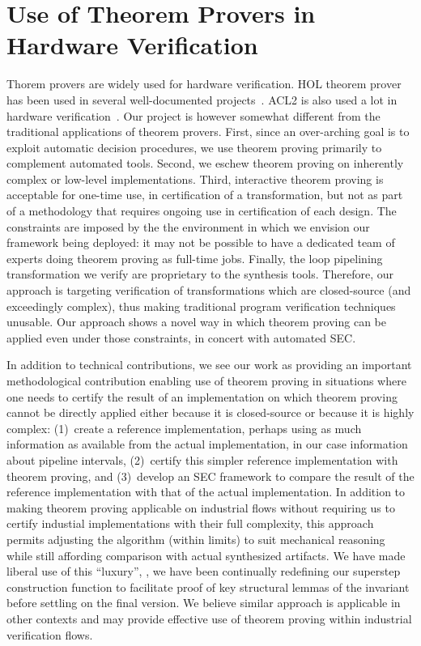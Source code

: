 \section{Use of Theorem Provers in Hardware Verification}
Thorem provers are widely used for hardware verification. 
HOL theorem prover~\cite{hol} has been used in 
several well-documented projects~\cite{cohn,graham}.
ACL2 is also used a lot in hardware 
verification~\cite{Russinoff,car2,car,Hardin,ray-abstracting,ray-connecting,ray-certification}. 
Our project is however somewhat different from the
traditional applications of theorem provers. 
First, since an over-arching goal is to exploit automatic
decision procedures, we use theorem proving primarily to
complement automated tools. Second, we eschew theorem
proving on inherently complex or low-level implementations.
Third, interactive theorem proving is acceptable for
one-time use, in certification of a transformation, 
but not as part of a methodology that
requires ongoing use in certification of each design. The
constraints are imposed by the the environment in which we
envision our framework being deployed: it may not be
possible to have a dedicated team of experts doing theorem
proving as full-time jobs. Finally, the loop pipelining transformation
we verify are proprietary to the synthesis tools. Therefore, our approach is
targeting verification of transformations
which are closed-source (and exceedingly complex), thus
making traditional program verification techniques unusable.
Our approach shows a novel way in which theorem
proving can be applied even under those constraints, in
concert with automated SEC.

In addition to technical contributions, we see our work as
providing an important methodological contribution enabling
use of theorem proving in situations where one needs to
certify the result of an implementation on which theorem
proving cannot be directly applied either because it is
closed-source or because it is highly complex: (1)~create a
reference implementation, perhaps using as much information
as available from the actual implementation, in our case
information about pipeline intervals, (2)~certify this
simpler reference implementation with theorem proving, and
(3)~develop an SEC framework to compare the result of the
reference implementation with that of the actual
implementation.  In addition to making theorem proving
applicable on industrial flows without requiring us to
certify industial implementations with their full
complexity, this approach permits adjusting the algorithm
(within limits) to suit mechanical reasoning while still
affording comparison with actual synthesized artifacts.  We
have made liberal use of this ``luxury'', \eg, we have
been continually redefining our superstep construction function
to facilitate proof of key structural lemmas of the
invariant before settling on the final version.  We believe similar approach is applicable in
other contexts and may provide effective use of theorem
proving within industrial verification flows.
